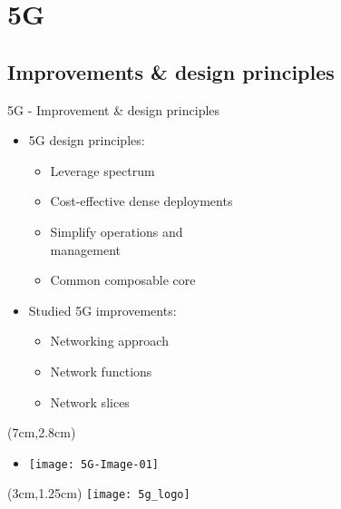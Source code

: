 \section{5G}
\subsection*{Improvements \& design principles}
\begin{frame}{5G - Improvement \& design principles}

  \begin{itemize}
    \item[]<1-> 5G design principles:
      \begin{itemize}
      \item<2-> Leverage spectrum
      \item<3-> Cost-effective dense deployments
      \item<4-> Simplify operations and \\ management
      \item<5-> Common composable core
      \end{itemize}
  \end{itemize}

  \begin{itemize}
    \item[]<6-> Studied 5G improvements:
      \begin{itemize}
      \item<7-> Networking approach
      \item<8-> Network functions
      \item<9-> Network slices
      \end{itemize}
  \end{itemize}

  \begin{textblock*}{5cm}(7cm,2.8cm)
    \begin{itemize}
      \item[]<9-> \texttt{[image: 5G-Image-01]}
    \end{itemize}
  \end{textblock*}

  \begin{textblock*}{5cm}(3cm,1.25cm)
    \texttt{[image: 5g\_logo]}
  \end{textblock*}
\end{frame}
